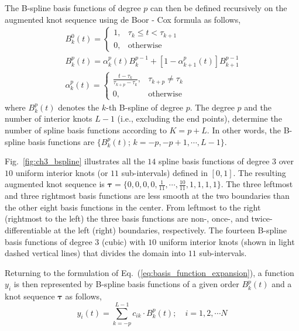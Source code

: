 The B-spline basis functions of degree $p$ can then be defined recursively on the augmented knot sequence using de Boor - Cox formula as follows, 
\begin{equation}
	\begin{split}
		B^0_k (t) = 
			\begin{cases}
				1, & \tau_k \leq t < \tau_{k+1} \\
			0, & \text{otherwise}
	\end{cases} \\
	B^p_k (t) =  \alpha^p_k (t) B^{p-1}_k + \left[1 - \alpha^p_{k+1} (t)\right] B^{p-1}_{k+1} \\
	\alpha^p_k (t) =
	\begin{cases}
				\frac{t - \tau_k}{\tau_{k+p}-\tau_k}, & \tau_{k+p} \neq \tau_k \\
			  0, & \text{otherwise}
	\end{cases}
	\end{split} 
\label{eq:deboor_cox}
\end{equation}
where $B_k^p (t)$ denotes the $k$-th B-spline of degree $p$.
The degree $p$ and the number of interior knots $L-1$ (i.e., excluding the end points), 
determine the number of spline basis functions according to $K = p + L$.
In other words, the B-spline basis functions are $\{B_k^p (t); \, k = -p,-p+1,\cdots,L-1\}$.

Fig.~\ref{fig:ch3_bspline} illustrates all the $14$ spline basis functions of degree $3$ over $10$ uniform interior knots (or $11$ sub-intervals) defined in $[0,1]$.
The resulting augmented knot sequence is $\boldsymbol{\tau}=\{0, 0, 0, 0, \frac{1}{11}, \cdots, \frac{10}{11}, 1, 1, 1, 1\}$.
The three leftmost and three rightmost basis functions are less smooth at the two boundaries than the other eight basis functions in the center. 
From leftmost to the right (rightmost to the left) the three basis functions are non-, once-, and twice-differentiable at the left (right) boundaries, respectively.
{The fourteen B-spline basis functions of degree $3$ (cubic) with $10$ uniform interior knots (shown in light dashed vertical lines) that divides the domain into $11$ sub-intervals.}

Returning to the formulation of Eq.~(\ref{eq:basis_function_expansion}),
a function $y_i$ is then represented by B-spline basis functions of a given order $B_k^p (t)$ and a knot sequence $\boldsymbol{\tau}$ as follows,
\begin{equation}
	y_i (t) = \sum_{k = -p}^{L-1} c_{ik} \cdot B^p_k (t); \quad i = 1, 2, \cdots N
\label{eq:basis_function_expansion_2}
\end{equation}

